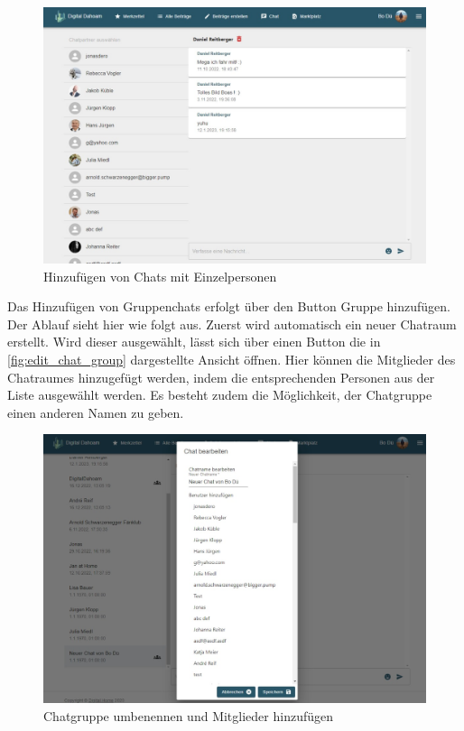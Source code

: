 \begin{figure}[!htb]
    \centering
    \includegraphics[width=.9\textwidth]{figures/boas/21_new_chat.jpeg}
    \caption[]{Hinzufügen von Chats mit Einzelpersonen}
    \label{fig:new_personal_chat}
\end{figure}

Das Hinzufügen von Gruppenchats erfolgt über den Button \glqq Gruppe hinzufügen\grqq. Der Ablauf sieht hier wie folgt aus. Zuerst wird automatisch ein neuer Chatraum erstellt. Wird dieser ausgewählt, lässt sich über einen Button die in \autoref{fig:edit_chat_group} dargestellte Ansicht öffnen. Hier können die Mitglieder des Chatraumes hinzugefügt werden, indem die entsprechenden Personen aus der Liste ausgewählt werden. Es besteht zudem die Möglichkeit, der Chatgruppe einen anderen Namen zu geben.

\begin{figure}[!htb]
    \centering
    \includegraphics[width=.9\textwidth]{figures/boas/21_edit_chat_group.jpeg}
    \caption[]{Chatgruppe umbenennen und Mitglieder hinzufügen}
    \label{fig:edit_chat_group}
\end{figure}

